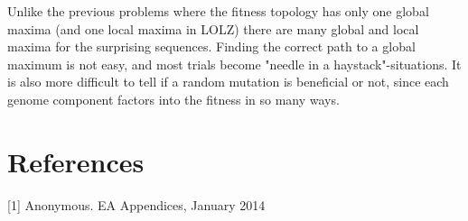 Unlike the previous problems where the fitness topology has only one global maxima (and one local maxima in LOLZ) there are many global and local maxima for the surprising sequences.
Finding the correct path to a global maximum is not easy,
and most trials become "needle in a haystack"-situations.
It is also more difficult to tell if a random mutation is beneficial or not,
since each genome component factors into the fitness in so many ways.

\section*{References}
[1] Anonymous. EA Appendices, January 2014
